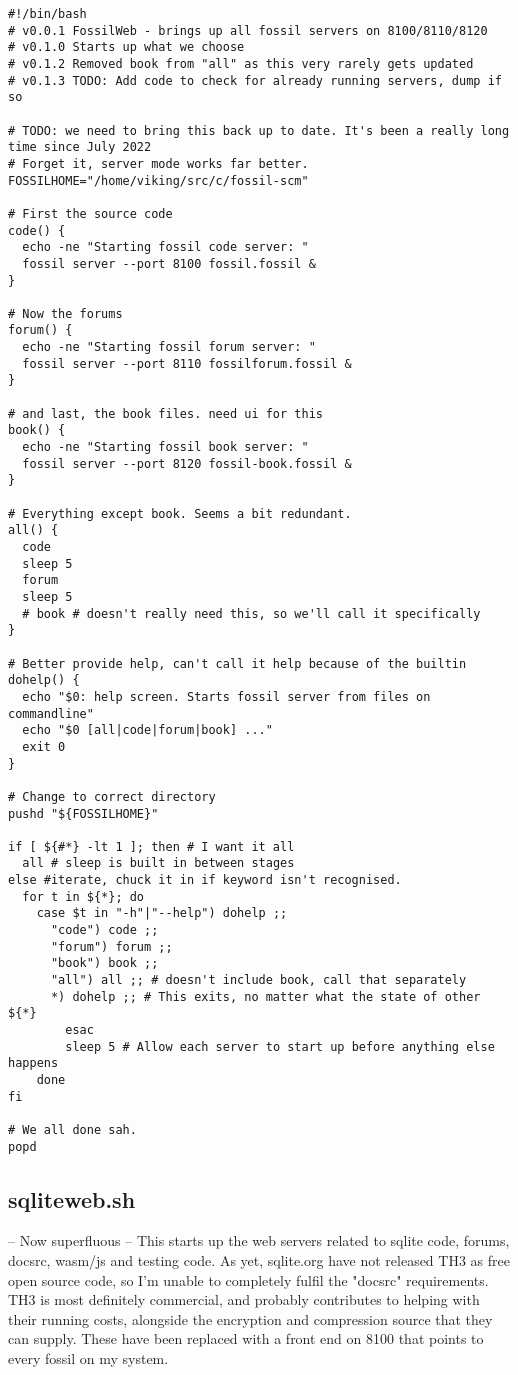 \documentclass[11pt]{article}
\begin{document}
\begin{verbatim}
#!/bin/bash
# v0.0.1 FossilWeb - brings up all fossil servers on 8100/8110/8120
# v0.1.0 Starts up what we choose
# v0.1.2 Removed book from "all" as this very rarely gets updated
# v0.1.3 TODO: Add code to check for already running servers, dump if so

# TODO: we need to bring this back up to date. It's been a really long time since July 2022
# Forget it, server mode works far better.
FOSSILHOME="/home/viking/src/c/fossil-scm"

# First the source code
code() {
  echo -ne "Starting fossil code server: "
  fossil server --port 8100 fossil.fossil &
}

# Now the forums
forum() {
  echo -ne "Starting fossil forum server: "
  fossil server --port 8110 fossilforum.fossil &
}

# and last, the book files. need ui for this
book() {
  echo -ne "Starting fossil book server: "
  fossil server --port 8120 fossil-book.fossil &
}

# Everything except book. Seems a bit redundant.
all() {
  code
  sleep 5
  forum
  sleep 5
  # book # doesn't really need this, so we'll call it specifically
}

# Better provide help, can't call it help because of the builtin
dohelp() {
  echo "$0: help screen. Starts fossil server from files on commandline"
  echo "$0 [all|code|forum|book] ..."
  exit 0
}

# Change to correct directory
pushd "${FOSSILHOME}"

if [ ${#*} -lt 1 ]; then # I want it all
  all # sleep is built in between stages
else #iterate, chuck it in if keyword isn't recognised.
  for t in ${*}; do
    case $t in "-h"|"--help") dohelp ;;
      "code") code ;;
      "forum") forum ;;
      "book") book ;;
      "all") all ;; # doesn't include book, call that separately
      *) dohelp ;; # This exits, no matter what the state of other ${*}
		esac
		sleep 5 # Allow each server to start up before anything else happens
	done
fi

# We all done sah.
popd

\end{verbatim}

\subsection*{sqliteweb.sh}
\label{sec:orgdfbcbba}
-- Now superfluous --
This starts up the web servers related to sqlite code, forums, docsrc, wasm/js and testing code. As yet,
sqlite.org have not released TH3 as free open source code, so I'm unable to completely fulfil
the "docsrc" requirements. TH3 is most definitely commercial, and probably contributes to helping
with their running costs, alongside the encryption and compression source that they can supply.
These have been replaced with a front end on 8100 that points to every fossil on my system.
\end{document}

